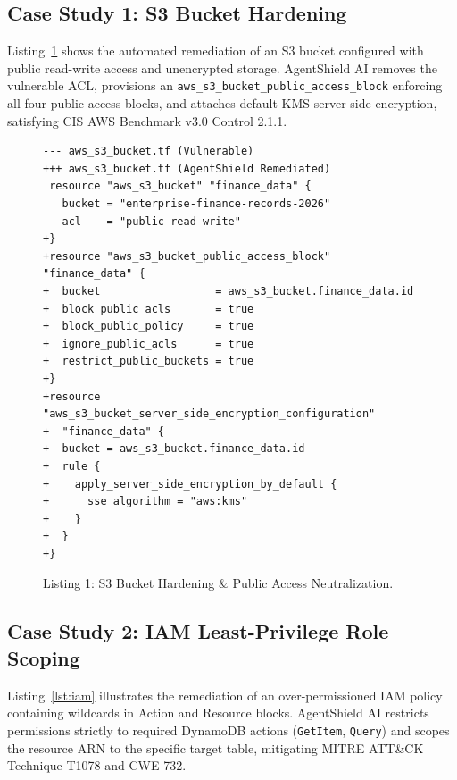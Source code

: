 \documentclass[runningheads]{llncs}
\begin{document}
\subsection{Case Study 1: S3 Bucket Hardening}
Listing~\ref{lst:s3} shows the automated remediation of an S3 bucket configured with public read-write access and unencrypted storage. AgentShield AI removes the vulnerable ACL, provisions an \texttt{aws\_s3\_bucket\_public\_access\_block} enforcing all four public access blocks, and attaches default KMS server-side encryption, satisfying CIS AWS Benchmark v3.0 Control 2.1.1.

\begin{figure}[t]
\centering
\begin{minipage}{0.95\textwidth}
\begin{scriptsize}
\begin{verbatim}
--- aws_s3_bucket.tf (Vulnerable)
+++ aws_s3_bucket.tf (AgentShield Remediated)
 resource "aws_s3_bucket" "finance_data" {
   bucket = "enterprise-finance-records-2026"
-  acl    = "public-read-write"
+}
+resource "aws_s3_bucket_public_access_block" "finance_data" {
+  bucket                  = aws_s3_bucket.finance_data.id
+  block_public_acls       = true
+  block_public_policy     = true
+  ignore_public_acls      = true
+  restrict_public_buckets = true
+}
+resource "aws_s3_bucket_server_side_encryption_configuration"
+  "finance_data" {
+  bucket = aws_s3_bucket.finance_data.id
+  rule {
+    apply_server_side_encryption_by_default {
+      sse_algorithm = "aws:kms"
+    }
+  }
+}
\end{verbatim}
\end{scriptsize}
\end{minipage}
\caption{Listing 1: S3 Bucket Hardening \& Public Access Neutralization.}
\label{lst:s3}
\end{figure}

\subsection{Case Study 2: IAM Least-Privilege Role Scoping}
Listing~\ref{lst:iam} illustrates the remediation of an over-permissioned IAM policy containing wildcards in Action and Resource blocks. AgentShield AI restricts permissions strictly to required DynamoDB actions (\texttt{GetItem}, \texttt{Query}) and scopes the resource ARN to the specific target table, mitigating MITRE ATT\&CK Technique T1078 and CWE-732.
\end{document}
